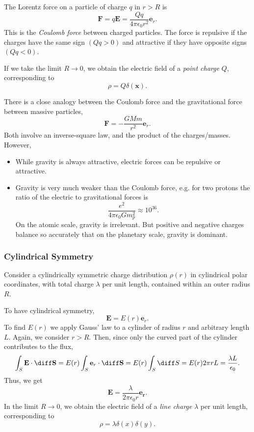 \documentclass[12pt]{article}
\begin{document}
The Lorentz force on a particle of charge $q$ in $r > R$ is
\[
\mathbf{F} = q \mathbf{E} = \frac{Qq}{4 \pi \epsilon_0 r^2} \mathbf{e}_r
.\]
This is the \emph{Coulomb force} between charged particles. The force is repulsive if the charges have the same sign $(Qq > 0)$ and attractive if they have opposite signs $(Qq < 0)$.

If we take the limit $R \to 0$, we obtain the electric field of a \emph{point charge} $Q$, corresponding to
\[
\rho = Q \delta(\mathbf{x})
.\]

There is a close analogy between the Coulomb force and the gravitational force between massive particles,
\[
	\mathbf{F} = - \frac{GMm}{r^2} \mathbf{e}_r
.\]
Both involve an inverse-square law, and the product of the charges/masses. However,
\begin{itemize}
	\item While gravity is always attractive, electric forces can be repulsive or attractive.
	\item Gravity is very much weaker than the Coulomb force, e.g. for two protons the ratio of the electric to gravitational forces is
		\[
		\frac{e^2}{4 \pi \epsilon_0 G m_p^2} \approx 10^{36}
		.\]
		On the atomic scale, gravity is irrelevant. But positive and negative charges balance so accurately that on the planetary scale, gravity is dominant.
\end{itemize}

\subsubsection{Cylindrical Symmetry}
\label{subsub:cylindrical_symmetry}

Consider a cylindrically symmetric charge distribution $\rho(r)$ in cylindrical polar coordinates, with total charge $\lambda$ per unit length, contained within an outer radius $R$.

To have cylindrical symmetry,
\[
\mathbf{E} = E(r) \mathbf{e}_r
.\]
To find  $E(r)$ we apply Gauss' law to a cylinder of radius $r$ and arbitrary length $L$. Again, we consider $r > R$. Then, since only the curved part of the cylinder contributes to the flux,
\[
\int_{S}\mathbf{E} \cdot \diff \mathbf{S} = E(r) \int_{S}\mathbf{e}_r \cdot \diff \mathbf{S} = E(r) \int_{S} \diff S = E(r) 2 \pi r L = \frac{\lambda L}{\epsilon_0}
.\]
Thus, we get
\[
\mathbf{E} = \frac{\lambda}{2 \pi \epsilon_0 r} \mathbf{e_r}
.\]
In the limit $R \to 0$, we obtain the electric field of a \emph{line charge} $\lambda$ per unit length, corresponding to
\[
\rho = \lambda \delta(x) \delta(y)
.\]
\end{document}
